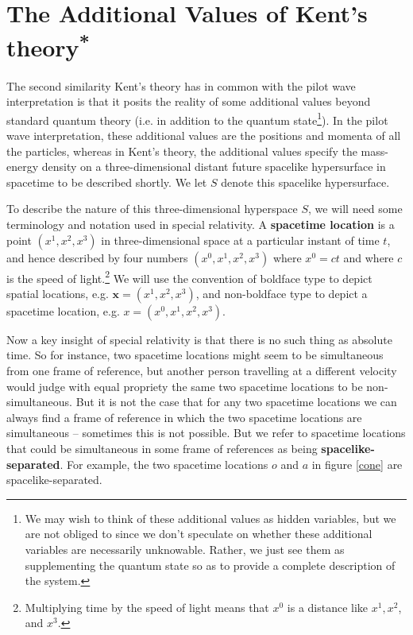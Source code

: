 \section{The Additional Values of Kent's theory\textsuperscript{*}\label{additional}}
The second similarity Kent's theory has in common with the pilot wave interpretation is that it posits the reality of some additional values beyond standard quantum theory (i.e. in addition to the quantum state\footnote{We may wish to think of these additional values as hidden variables, but we are not obliged to since we don't speculate on whether these additional variables are necessarily unknowable. Rather, we just see them as supplementing the quantum state so as to provide a complete description of the system.}). In the pilot wave interpretation, these additional values are the positions and momenta of all the particles, whereas in Kent's theory, the additional values specify the mass-energy density on a three-dimensional distant future spacelike hypersurface in spacetime to be described shortly. We let $S$ denote this spacelike hypersurface. 

To describe the nature of this three-dimensional hyperspace $S$, we will need some terminology and notation used in special relativity. A \textbf{spacetime location} is a point $(x^1,x^2,x^3)$ in three-dimensional space at a particular instant of time $t$, and hence described by four numbers $(x^0,x^1,x^2,x^3)$ where $x^0=c t$ and where $c$ is the speed of light.\footnote{Multiplying time by the speed of light means that $x^0$ is a distance like $x^1,x^2$, and $x^3$. } We will use the convention of boldface type to depict spatial locations, e.g. $\bm{x}=(x^1,x^2,x^3)$, and non-boldface type to depict a spacetime location, e.g. $x=(x^0,x^1,x^2,x^3)$. 

Now a key insight of special relativity is that there is no such thing as absolute time. So for instance, two spacetime locations might seem to be simultaneous from one frame of reference, but another person travelling at a different velocity would judge with equal propriety the same two spacetime locations to be non-simultaneous. But it is not the case that for any two spacetime locations we can always find a frame of reference in which the two spacetime locations are simultaneous -- sometimes this is not possible. But we refer to spacetime locations that could be simultaneous in some frame of references as being \textbf{spacelike-separated}. For example, the two spacetime locations $o$ and $a           $  in figure \ref{cone} are spacelike-separated. 

